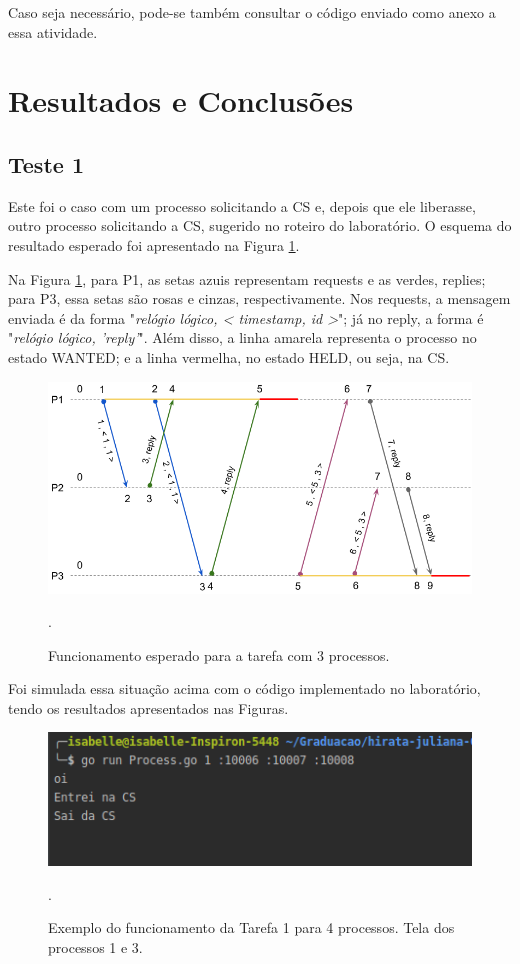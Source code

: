\documentclass[conference]{IEEEtran}
\begin{document}
	Caso seja necessário, pode-se também consultar o código enviado como anexo a essa atividade. 

\section{Resultados e Conclusões} \label{results}

\subsection{Teste 1}

	Este foi o caso com um processo solicitando a CS e, depois que ele liberasse, outro processo solicitando a CS, sugerido no roteiro do laboratório. O esquema do resultado esperado foi apresentado na Figura \ref{ex1}.
	
	Na Figura \ref{ex1}, para P1, as setas azuis representam requests e as verdes, replies; para P3, essa setas são rosas e cinzas, respectivamente. Nos requests, a mensagem enviada é da forma "\textit{relógio lógico, < timestamp, id >}"; já no reply, a forma é "\textit{relógio lógico, 'reply'}". Além disso, a linha amarela representa o processo no estado WANTED; e a linha vermelha, no estado HELD, ou seja, na CS.
	
\begin{figure}[H]
\centering
\centerline{\includegraphics[scale=0.3]{imagens/ex1.png}}
\caption{Funcionamento esperado para a tarefa com 3 processos.}.
\label{ex1}
\end{figure}

	Foi simulada essa situação acima com o código implementado no laboratório, tendo os resultados apresentados nas Figuras.
	
\begin{figure}[H]
\centering
\centerline{\includegraphics[scale=0.5]{imagens/ex1-proc1-clean.png}}
\caption{Exemplo do funcionamento da Tarefa 1 para 4 processos. Tela dos processos 1 e 3.}.
\label{tarefa1-testecriado-1}
\end{figure}
\end{document}
